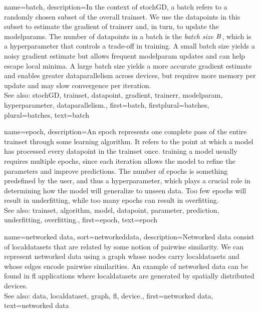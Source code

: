 {name={batch},
	description={In the context of \gls{stochGD}, a batch refers to a randomly
		chosen subset of the overall \gls{trainset}. We use the \glspl{datapoint} in this subset
		to estimate the \gls{gradient} of \gls{trainerr} and, in turn, to update the \glspl{modelparam}.
		The number of \glspl{datapoint} in a batch is the \emph{batch size} $B$,
		which is a \gls{hyperparameter} that controls a trade-off in \gls{training}.
		A small batch size yields a noisy \gls{gradient} estimate but allows
		frequent \gls{modelparam} updates and can help escape local minima.
		A large batch size yields a more accurate \gls{gradient} estimate and
		enables greater \gls{dataparallelism} across \glspl{device}, but requires
		more memory per update and may slow convergence per iteration.
			\\
		See also: \gls{stochGD}, \gls{trainset}, \gls{datapoint}, \gls{gradient},
		\gls{trainerr}, \gls{modelparam}, \gls{hyperparameter}, \gls{dataparallelism}.}, 
 	first={batch},
 	firstplural={batches}, 
 	plural={batches}, 
 	text={batch}  
}

{name={epoch},
	description={An epoch represents one complete pass of the entire \gls{trainset} through some learning 
		\gls{algorithm}. It refers to the point at which a \gls{model} has processed every \gls{datapoint} in the \gls{trainset} once. 
		\Gls{training} a \gls{model} usually requires multiple epochs, since each \gls{iteration} allows the \gls{model} to refine the 
		\glspl{parameter} and improve \glspl{prediction}. The number of epochs is something predefined by the user,  
		and thus a \gls{hyperparameter}, which plays a crucial role in determining how the \gls{model} will generalize to unseen \gls{data}. 
		Too few epochs will result in \gls{underfitting}, while too many epochs can result in \gls{overfitting}.
		\\
		See also: \gls{trainset}, \gls{algorithm}, \gls{model}, \gls{datapoint}, \gls{parameter}, \gls{prediction}, \gls{underfitting}, \gls{overfitting}.},
	first={epoch},
	text={epoch}
} 

{name={networked data},
sort={networkeddata},
	description={Networked \gls{data} consist of \glspl{localdataset} 
		that are related by some notion of pairwise similarity. We can represent networked 
		\gls{data} using a \gls{graph} whose nodes carry \glspl{localdataset} and whose edges encode 
		pairwise similarities. An example of networked \gls{data} can be found in \gls{fl} applications 
		where \glspl{localdataset} are generated by spatially distributed \glspl{device}.
			\\
		See also: \gls{data}, \gls{localdataset}, \gls{graph}, \gls{fl}, \gls{device}.}, 
	first={networked data},
	text={networked data}  
}

